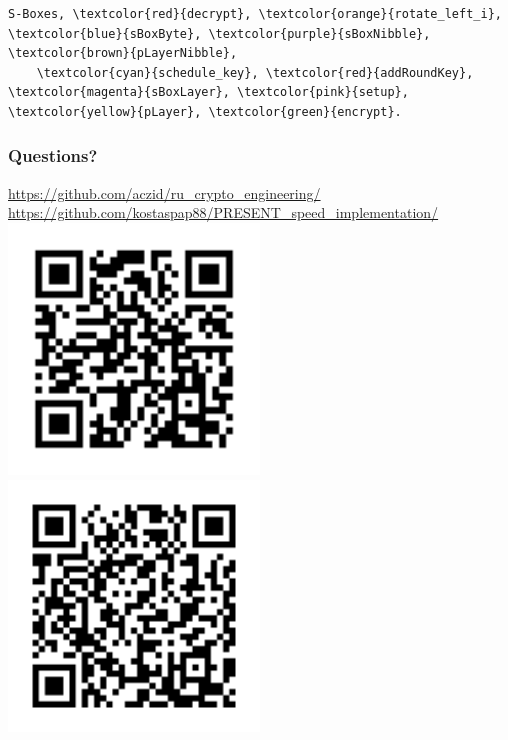 \documentclass{beamer}
\begin{document}
\begin{frame}[fragile]
\begin{overprint}
{\begin{Verbatim}[commandchars=\\\{\}]
    S-Boxes, \textcolor{red}{decrypt}, \textcolor{orange}{rotate_left_i}, \textcolor{blue}{sBoxByte}, \textcolor{purple}{sBoxNibble}, \textcolor{brown}{pLayerNibble},
    \textcolor{cyan}{schedule_key}, \textcolor{red}{addRoundKey}, \textcolor{magenta}{sBoxLayer}, \textcolor{pink}{setup}, \textcolor{yellow}{pLayer}, \textcolor{green}{encrypt}.
    \end{Verbatim}
}
\end{overprint}
\end{frame}

\begin{frame}[fragile]
\frametitle{Questions?}
	\footnotesize{
	\url{https://github.com/aczid/ru_crypto_engineering/}
	\url{https://github.com/kostaspap88/PRESENT_speed_implementation/}
	}
	\includegraphics[width=0.5\textwidth]{qr_url}
	\includegraphics[width=0.5\textwidth]{qr_url2}
\end{frame}


\end{document}
